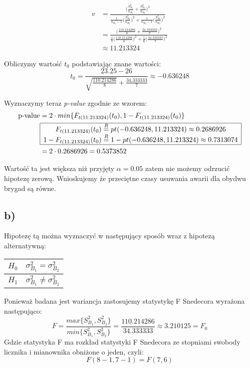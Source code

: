 \documentclass{article}
\begin{document}
\begin{align*}
v & = \frac{ \Big( \frac{S_{B_1}^2}{n_{B_1}} + \frac{S_{B_2}^2}{n_{B_2}} \Big)^2 }{\frac{1}{n_{B_1}-1} \Big( \frac{S_{B_1}^2}{n_{B_1}} \Big)^2 + \frac{1}{n_{B_2}-1} \Big( \frac{S_{B_2}^2}{n_{B_2}} \Big)^2 } \\
& = \frac{ \Big( \frac{110.214286}{8} + \frac{34.333333}{7} \Big)^2 }{\frac{1}{7} \Big( \frac{110.214286}{8} \Big)^2 + \frac{1}{6} \Big( \frac{34.333333}{7} \Big)^2 } \\
& \approx 11.213324
\end{align*}

Obliczymy wartość $t_0$ podstawiając znane wartości:
\[ t_0 = \frac{23.25 - 26}{\sqrt{ \frac{110.214286}{8}} + \frac{34.333333}{7}}  \approx -0.636248 \]

Wyznaczymy teraz \textit{p-value} zgodnie ze wzorem:
\begin{align*}
\text{p-value} & = 2 \cdot min\{ F_{t(11.213324)}(t_0), 1 - F_{t(11.213324)}(t_0) \} \\
& \begin{array}{|c|}
\hline
F_{t(11.213324)}(t_0)  \overset{R}{=} pt(-0.636248, 11.213324) \approx 0.2686926 \\
1 - F_{t(11.213324)}(t_0) \overset{R}{=} 1 -  pt(-0.636248, 11.213324) \approx  0.7313074\\ \hline
\end{array} \\
& = 2 \cdot 0.2686926 = 0.5373852
\end{align*}

Wartość ta jest większa niż przyjęty $\alpha = 0.05$ zatem nie możemy odrzucić hipotezę zerową. Wnioskujemy że przeciętne czasy usuwania awarii dla obydwu brygad są równe.

\subsection{b)}
Hipotezę tą można wyznaczyć w następujący sposób wraz z hipotezą alternatywną:
\begin{center} \begin{tabular}{|c|c|} \hline
$H_0$ & $\sigma^2_{B_1} = \sigma^2_{B_2}$ \\ \hline
$H_1$ & $\sigma^2_{B_1} \neq \sigma^2_{B_2}$ \\ \hline
\end{tabular} \end{center}

Ponieważ badana jest wariancja zastosujemy statystykę F Snedecora wyrażona następująco:
\[ F = \frac{max\{S_{B_1}^2, S_{B_2}^2\}}{min\{S_{B_1}^2, S_{B_2}^2\}} = \frac{110.214286}{34.333333} \approx 3.210125 = F_0 \]
Gdzie statystyka F ma rozkład statystyki F Snedecora ze stopniami swobody licznika i mianownika obniżone o jeden, czyli:
\[ F(8-1, 7-1) = F(7,6) \]
\end{document}
